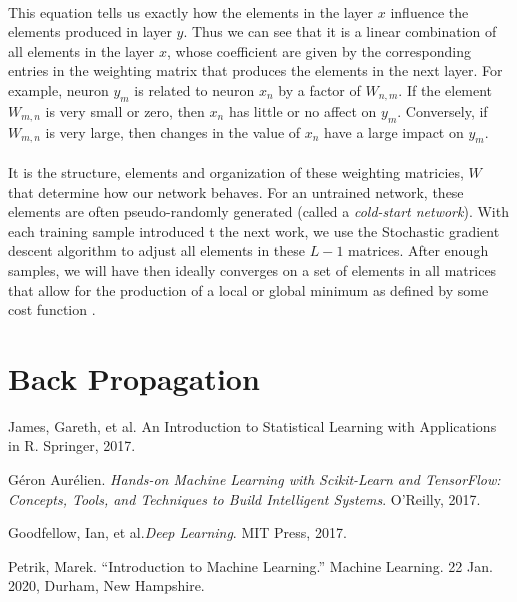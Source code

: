 \documentclass[12pt,letterpaper]{article}
\begin{document}
\paragraph*{}This equation tells us exactly how the elements in the layer $x$ influence the elements produced in layer $y$. Thus we can see that it is a linear combination of all elements in the layer $x$, whose coefficient are given by the corresponding entries in the weighting matrix that produces the elements in the next layer. For example, neuron $y_m$ is related to neuron $x_n$ by a factor of $W_{n,m}$. If the element $W_{m,n}$ is very small or zero, then $x_n$ has little or no affect on $y_m$. Conversely, if $W_{m,n}$ is very large, then changes in the value of $x_n$ have a large impact on $y_m$.
\paragraph*{}It is the structure, elements and organization of these weighting matricies, $W$ that determine how our network behaves. For an untrained network, these elements are often pseudo-randomly generated (called a \textit{cold-start network}\cite{Geron}). With each training sample introduced t the next work, we use the Stochastic gradient descent algorithm to adjust all elements in these $L-1$ matrices. After enough samples, we will have then ideally converges on a set of elements in all matrices that allow for the production of a local or global minimum as defined by some cost function \cite{Goodfellow}. 


\section{Back Propagation}


\begin{thebibliography}{9}


James, Gareth, et al. {An Introduction to Statistical Learning with Applications in R}. Springer, 2017.

Géron Aurélien. \textit{Hands-on Machine Learning with Scikit-Learn and TensorFlow: Concepts, Tools, and Techniques to Build Intelligent Systems}. O'Reilly, 2017.

Goodfellow, Ian, et al.\textit{Deep Learning}. MIT Press, 2017.

Petrik, Marek. “Introduction to Machine Learning.” Machine Learning. 22 Jan. 2020, Durham, New Hampshire.

\end{thebibliography}

\end{document}
